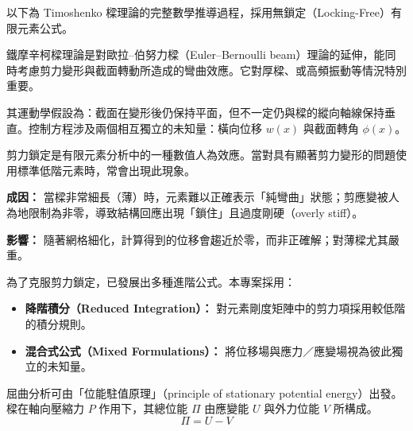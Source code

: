 \documentclass[UTF8, a4paper, 12pt]{ctexart}
\begin{document}
以下為 Timoshenko 樑理論的完整數學推導過程，採用無鎖定（Locking-Free）有限元素公式。


鐵摩辛柯樑理論是對歐拉–伯努力樑（Euler–Bernoulli beam）理論的延伸，能同時考慮剪力變形與截面轉動所造成的彎曲效應。它對厚樑、或高頻振動等情況特別重要。

其運動學假設為：截面在變形後仍保持平面，但不一定仍與樑的縱向軸線保持垂直。控制方程涉及兩個相互獨立的未知量：橫向位移 $w(x)$ 與截面轉角 $\phi(x)$。


剪力鎖定是有限元素分析中的一種數值人為效應。當對具有顯著剪力變形的問題使用標準低階元素時，常會出現此現象。

\textbf{成因：} 當樑非常細長（薄）時，元素難以正確表示「純彎曲」狀態；剪應變被人為地限制為非零，導致結構回應出現「鎖住」且過度剛硬（overly stiff）。

\textbf{影響：} 隨著網格細化，計算得到的位移會趨近於零，而非正確解；對薄樑尤其嚴重。


為了克服剪力鎖定，已發展出多種進階公式。本專案採用：
\begin{itemize}
  \item \textbf{降階積分（Reduced Integration）：} 對元素剛度矩陣中的剪力項採用較低階的積分規則。
  \item \textbf{混合式公式（Mixed Formulations）：} 將位移場與應力／應變場視為彼此獨立的未知量。
\end{itemize}


屈曲分析可由「位能駐值原理」（principle of stationary potential energy）出發。樑在軸向壓縮力 $P$ 作用下，其總位能 $\Pi$ 由應變能 $U$ 與外力位能 $V$ 所構成。
\begin{equation}
  \Pi = U - V
\end{equation}
\end{document}
